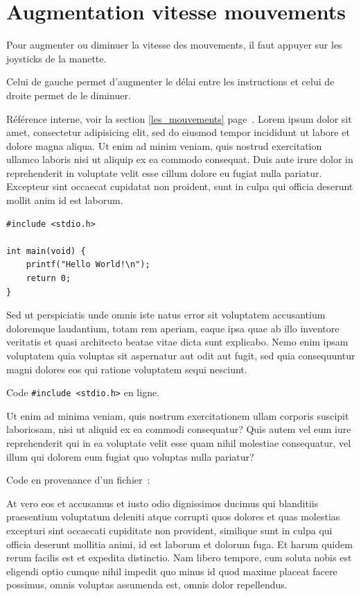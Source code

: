 		\section{Augmentation vitesse mouvements}

Pour augmenter ou diminuer la vitesse des mouvements, il faut appuyer sur les joysticks de la manette.

Celui de gauche permet d'augmenter le délai entre les instructions et celui de droite permet de le diminuer.
		
Référence interne, voir la section \ref{les_mouvements} page~\pageref{les_mouvements}. %
Lorem ipsum dolor sit amet, consectetur adipisicing elit, sed do eiusmod tempor incididunt ut labore et dolore magna aliqua. Ut enim ad minim veniam, quis nostrud exercitation ullamco laboris nisi ut aliquip ex ea commodo consequat. Duis aute irure dolor in reprehenderit in voluptate velit esse cillum dolore eu fugiat nulla pariatur. Excepteur sint occaecat cupidatat non proident, sunt in culpa qui officia deserunt mollit anim id est laborum.

\begin{lstlisting}[style=sourceC]
#include <stdio.h>

int main(void) {
	printf("Hello World!\n");
	return 0;
}
\end{lstlisting}		

 
Sed ut perspiciatis unde omnis iste natus error sit voluptatem accusantium doloremque laudantium, totam rem aperiam, eaque ipsa quae ab illo inventore veritatis et quasi architecto beatae vitae dicta sunt explicabo. Nemo enim ipsam voluptatem quia voluptas sit aspernatur aut odit aut fugit, sed quia consequuntur magni dolores eos qui ratione voluptatem sequi nesciunt. 

Code \lstinline[style=sourceC]!#include <stdio.h>! en ligne.


Ut enim ad minima veniam, quis nostrum exercitationem ullam corporis suscipit laboriosam, nisi ut aliquid ex ea commodi consequatur? Quis autem vel eum iure reprehenderit qui in ea voluptate velit esse quam nihil molestiae consequatur, vel illum qui dolorem eum fugiat quo voluptas nulla pariatur?

Code en provenance d'un fichier~:

 

At vero eos et accusamus et iusto odio dignissimos ducimus qui blanditiis praesentium voluptatum deleniti atque corrupti quos dolores et quas molestias excepturi sint occaecati cupiditate non provident, similique sunt in culpa qui officia deserunt mollitia animi, id est laborum et dolorum fuga. Et harum quidem rerum facilis est et expedita distinctio. Nam libero tempore, cum soluta nobis est eligendi optio cumque nihil impedit quo minus id quod maxime placeat facere possimus, omnis voluptas assumenda est, omnis dolor repellendus. 

